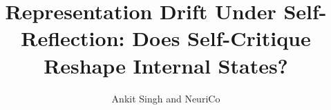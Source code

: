 \documentclass{article}
\title{Representation Drift Under Self-Reflection: Does Self-Critique Reshape Internal States?}
\author{Ankit Singh and NeuriCo}
\begin{document}
\maketitle

\begin{abstract}

\end{abstract}









\end{document}
